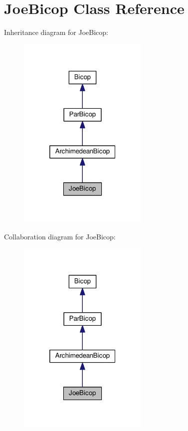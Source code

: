 \hypertarget{class_joe_bicop}{\section{Joe\+Bicop Class Reference}
\label{class_joe_bicop}
}


Inheritance diagram for Joe\+Bicop\+:\nopagebreak
\begin{figure}[H]
\begin{center}
\leavevmode
\includegraphics[width=176pt]{class_joe_bicop__inherit__graph}
\end{center}
\end{figure}


Collaboration diagram for Joe\+Bicop\+:\nopagebreak
\begin{figure}[H]
\begin{center}
\leavevmode
\includegraphics[width=176pt]{class_joe_bicop__coll__graph}
\end{center}
\end{figure}
